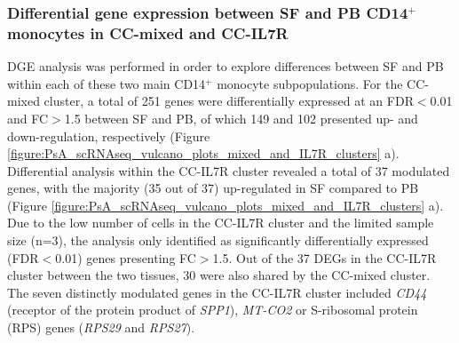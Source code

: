 \subsubsection{Differential gene expression between SF and PB CD14$^+$ monocytes in CC-mixed and CC-IL7R}
DGE analysis was performed in order to explore differences between SF and PB within each of these two main CD14$^+$ monocyte subpopulations. For the CC-mixed cluster, a total of 251 genes were differentially expressed at an FDR$<$0.01 and FC$>$1.5 between SF and PB, of which 149 and 102 presented up- and down-regulation, respectively (Figure \ref{figure:PsA_scRNAseq_vulcano_plots_mixed_and_IL7R_clusters} a). Differential analysis within the CC-IL7R cluster revealed a total of 37 modulated genes, with the majority (35 out of 37) up-regulated in SF compared to PB (Figure \ref{figure:PsA_scRNAseq_vulcano_plots_mixed_and_IL7R_clusters} a). Due to the low number of cells in the CC-IL7R cluster and the limited sample size (n=3), the analysis only identified as significantly differentially expressed (FDR$<$0.01) genes presenting FC$>$1.5. Out of the 37 DEGs in the CC-IL7R cluster between the two tissues, 30 were also shared by the CC-mixed cluster. The seven distinctly modulated genes in the CC-IL7R cluster included \textit{CD44} (receptor of the protein product of \textit{SPP1}), \textit{MT-CO2} or S-ribosomal protein (RPS) genes (\textit{RPS29} and \textit{RPS27}). 


